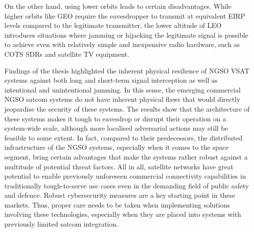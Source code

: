 \documentclass[english, 12pt, a4paper, elec, utf8, a-1b, online]{aaltothesis}
\begin{document}
On the other hand, using lower orbits leads to certain disadvantages.
While higher orbits like GEO require the eavesdropper to transmit at equivalent EIRP levels compared to the legitimate transmitter, the lower altitude of LEO introduces situations where jamming or hijacking the legitimate signal is possible to achieve even with relatively simple and inexpensive radio hardware, such as COTS SDRs and satellite TV equipment.

Findings of the thesis highlighted the inherent physical resilience of NGSO VSAT systems against both long and short-term signal interception as well as intentional and unintentional jamming.
In this sense, the emerging commercial NGSO satcom systems do not have inherent physical flaws that would directly jeopardise the security of these systems.
The results show that the architecture of these systems makes it tough to eavesdrop or disrupt their operation on a system-wide scale, although more localised adversarial actions may still be feasible to some extent.
In fact, compared to their predecessors, the distributed infrastructure of the NGSO systems, especially when it comes to the space segment, bring certain advantages that make the systems rather robust against a multitude of potential threat factors.
All in all, satellite networks have great potential to enable previously unforeseen commercial connectivity capabilities in traditionally tough-to-serve use cases even in the demanding field of public safety and defence.
Robust cybersecurity measures are a key starting point in these markets.
Thus, proper care needs to be taken when implementing solutions involving these technologies, especially when they are placed into systems with previously limited satcom integration.



\clearpage

\thesisbibliography




\clearpage

\thesisappendix

\end{document}
